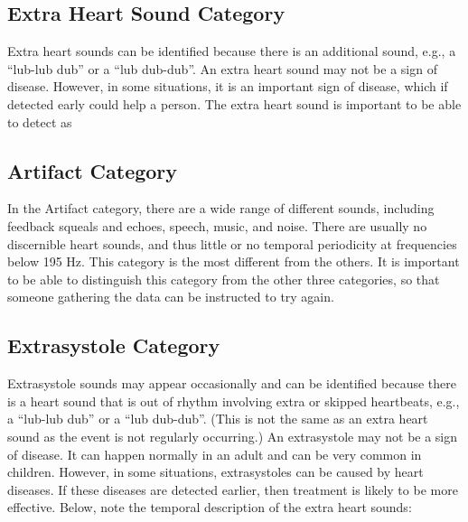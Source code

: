 \subsection{Extra Heart Sound Category}
Extra heart sounds can be identified because there is an additional sound, e.g., a ``lub-lub dub'' or a ``lub dub-dub''. An extra heart sound may not be a sign of disease.
However, in some situations, it is an important sign of disease, which if detected early could help a person. The extra heart sound is important to be able to detect as

\subsection{Artifact Category}
In the Artifact category, there are a wide range of different sounds, including feedback squeals and echoes, speech, music, and noise. There are usually no discernible heart sounds,
and thus little or no temporal periodicity at frequencies below 195 Hz. This category is the most different from the others. It is important to be able to distinguish this category
from the other three categories, so that someone gathering the data can be instructed to try again.

\subsection{Extrasystole Category}
Extrasystole sounds may appear occasionally and can be identified because there is a heart sound that is out of rhythm involving extra or skipped heartbeats,
e.g., a ``lub-lub dub'' or a ``lub dub-dub''. (This is not the same as an extra heart sound as the event is not regularly occurring.) An extrasystole may not be a sign of disease.
It can happen normally in an adult and can be very common in children. However, in some situations, extrasystoles can be caused by heart diseases. If these diseases are detected earlier,
then treatment is likely to be more effective. Below, note the temporal description of the extra heart sounds:
